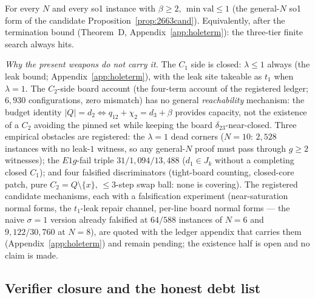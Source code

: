\begin{conjecture}\label{conj:gapex}
For every $N$ and every so1 instance with $\beta\ge2$,
$\min\mathrm{val}\le1$ (the general-$N$ so1 form of the candidate
Proposition~\ref{prop:2663cand}). Equivalently, after the termination bound
(Theorem~D, Appendix~\ref{app:holeterm}): the three-tier finite search always
hits.
\end{conjecture}

\emph{Why the present weapons do not carry it.} The $C_1$ side is closed: $\lambda\le1$
always (the leak bound; Appendix~\ref{app:holeterm}), with the leak site takeable as
$t_1$ when $\lambda=1$. The $C_2$-side board account (the four-term account of the
registered ledger; $6{,}930$ configurations, zero mismatch) has no general
\emph{reachability} mechanism: the budget identity $|Q|=d_2\iff q_{12}+\chi_2=d_3+\beta$
provides capacity, not the existence of a $C_2$ avoiding the pinned set while keeping the
board $\delta_{23}$-near-closed. Three empirical obstacles are registered: the
$\lambda=1$ dead corners ($N=10$: $2{,}528$ instances with no leak-$1$ witness, so any
general-$N$ proof must pass through $g\ge2$ witnesses); the $E1g$-fail triple
$31/1{,}094/13{,}488$ ($d_1\in J_k$ without a completing closed $C_1$); and four
falsified discriminators (tight-board counting, closed-core patch, pure
$C_2=Q\setminus\{x\}$, $\le3$-step swap ball: none is covering). The registered
candidate mechanisms, each with a falsification experiment (near-saturation normal
forms, the $t_1$-leak repair channel, per-line board normal forms --- the naive
$\sigma=1$ version already falsified at $64/588$ instances of $N=6$ and
$9{,}122/30{,}760$ at $N=8$), are quoted with the ledger appendix that carries them
(Appendix~\ref{app:holeterm}) and remain pending; the existence half is open and no
claim is made.

\subsection{Verifier closure and the honest debt list}\label{subsec:leandebt}

